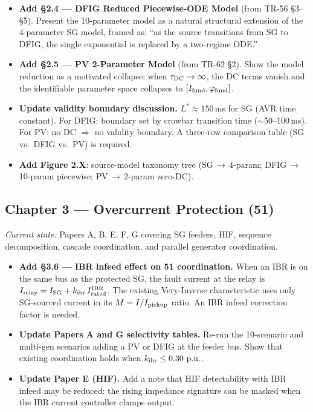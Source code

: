 \documentclass[12pt,a4paper]{article}
\newcommand{\pu}{\,\text{p.u.}}
\begin{document}
\begin{itemize}
  \item \textbf{Add §2.4 — DFIG Reduced Piecewise-ODE Model} (from TR-56 §3--§5).
    Present the 10-parameter model as a natural structural extension of the
    4-parameter SG model, framed as: ``as the source transitions from SG to DFIG,
    the single exponential is replaced by a two-regime ODE.''
  \item \textbf{Add §2.5 — PV 2-Parameter Model} (from TR-62 §2).
    Show the model reduction as a motivated collapse: when $\tau_{\rm DC} \to \infty$,
    the DC terms vanish and the identifiable parameter space collapses to
    $[I_{\rm fund}, \varphi_{\rm fund}]$.
  \item \textbf{Update validity boundary discussion.}
    $L^* \approx 150$\,ms for SG (AVR time constant).
    For DFIG: boundary set by crowbar transition time ($\sim$50--100\,ms).
    For PV: no DC $\Rightarrow$ no validity boundary.
    A three-row comparison table (SG vs.\ DFIG vs.\ PV) is required.
  \item \textbf{Add Figure 2.X}: source-model taxonomy tree
    (SG\,$\to$\,4-param; DFIG\,$\to$\,10-param piecewise; PV\,$\to$\,2-param zero-DC).
\end{itemize}

\subsection{Chapter 3 — Overcurrent Protection (51)}

\textit{Current state:} Papers A, B, E, F, G covering SG feeders, HIF, sequence decomposition,
cascade coordination, and parallel generator coordination.

\begin{itemize}
  \item \textbf{Add §3.6 — IBR infeed effect on 51 coordination.}
    When an IBR is on the same bus as the protected SG, the fault current at the relay
    is $I_{\rm relay} = I_{\rm SG} + k_{\rm ibr}\,I_{\rm rated}^{\rm IBR}$.
    The existing Very-Inverse characteristic uses only SG-sourced current in its
    $M = I/I_{\rm pickup}$ ratio.  An IBR infeed correction factor is needed.
  \item \textbf{Update Papers A and G selectivity tables.}
    Re-run the 10-scenario and multi-gen scenarios adding a PV or DFIG at the feeder bus.
    Show that existing coordination holds when $k_{\rm ibr} \le 0.30\,\pu$.
  \item \textbf{Update Paper E (HIF).}
    Add a note that HIF detectability with IBR infeed may be reduced: the rising
    impedance signature can be masked when the IBR current controller clamps output.
\end{itemize}
\end{document}
